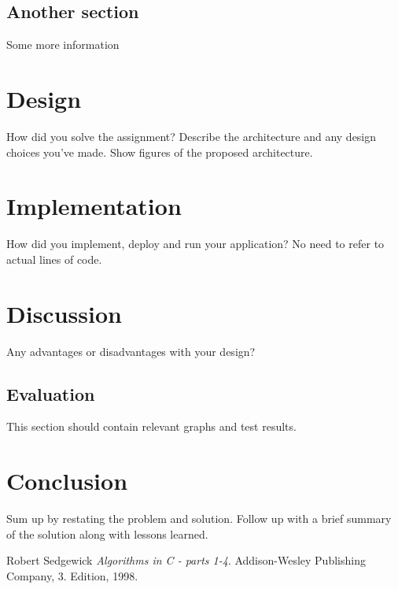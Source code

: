 \subsection{Another section}

Some more information

\section{Design}

How did you solve the assignment? Describe the architecture and any design choices you've made. Show figures of the proposed architecture.

\section{Implementation}

How did you implement, deploy and run your application? No need to refer to actual lines of code.

\section{Discussion}

Any advantages or disadvantages with your design?

\subsection{Evaluation}

This section should contain relevant graphs and test results.

\section{Conclusion}

Sum up by restating the problem and solution. Follow up with a brief summary of the solution along with lessons learned.



\newpage{}


\begin{thebibliography}{9}

 Robert Sedgewick 
  \emph{Algorithms in C - parts 1-4}.
  Addison-Wesley Publishing Company,
  3. Edition,
  1998.

\end{thebibliography}



